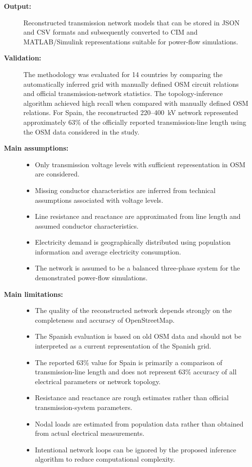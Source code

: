 \begin{description}
    \item[\textbf{Output:}]
    Reconstructed transmission network models that can be stored in JSON
    and CSV formats and subsequently converted to CIM and MATLAB/Simulink
    representations suitable for power-flow simulations.

    \item[\textbf{Validation:}]
    The methodology was evaluated for 14 countries by comparing the
    automatically inferred grid with manually defined OSM circuit relations
    and official transmission-network statistics. The topology-inference
    algorithm achieved high recall when compared with manually defined OSM
    relations. For Spain, the reconstructed 220--400~kV network represented
    approximately 63\% of the officially reported transmission-line length
    using the OSM data considered in the study.

    \item[\textbf{Main assumptions:}] \hfill
    \begin{itemize}
        \item Only transmission voltage levels with sufficient representation
        in OSM are considered.
        \item Missing conductor characteristics are inferred from technical
        assumptions associated with voltage levels.
        \item Line resistance and reactance are approximated from line length
        and assumed conductor characteristics.
        \item Electricity demand is geographically distributed using
        population information and average electricity consumption.
        \item The network is assumed to be a balanced three-phase system for
        the demonstrated power-flow simulations.
    \end{itemize}

    \item[\textbf{Main limitations:}] \hfill
    \begin{itemize}
        \item The quality of the reconstructed network depends strongly on
        the completeness and accuracy of OpenStreetMap.
        \item The Spanish evaluation is based on old OSM data and should not
        be interpreted as a current representation of the Spanish grid.
        \item The reported 63\% value for Spain is primarily a comparison of
        transmission-line length and does not represent 63\% accuracy of all
        electrical parameters or network topology.
        \item Resistance and reactance are rough estimates rather than
        official transmission-system parameters.
        \item Nodal loads are estimated from population data rather than
        obtained from actual electrical measurements.
        \item Intentional network loops can be ignored by the proposed
        inference algorithm to reduce computational complexity.
    \end{itemize}


\end{description}
